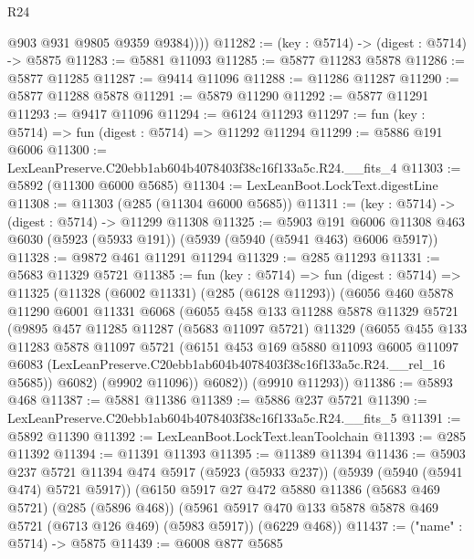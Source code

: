 \begin{lexlean}{R24}
\begin{coremodule}
            @903
            @931
            @9805
            @9359
            @9384))))
@11282 := (key : @5714) -> (digest : @5714) -> @5875
@11283 := @5881 @11093
@11285 := @5877 @11283 @5878
@11286 := @5877 @11285
@11287 := @9414 @11096
@11288 := @11286 @11287
@11290 := @5877 @11288 @5878
@11291 := @5879 @11290
@11292 := @5877 @11291
@11293 := @9417 @11096
@11294 := @6124 @11293
@11297 := fun (key : @5714) => fun (digest : @5714) => @11292 @11294
@11299 := @5886 @191 @6006
@11300 := LexLeanPreserve.C20ebb1ab604b4078403f38c16f133a5c.R24.__fits_4
@11303 := @5892 (@11300 @6000 @5685)
@11304 := LexLeanBoot.LockText.digestLine
@11308 := @11303 (@285 (@11304 @6000 @5685))
@11311 := (key : @5714) -> (digest : @5714) -> @11299 @11308
@11325 := @5903
    @191
    @6006
    @11308
    @463
    @6030
    (@5923 (@5933 @191))
    (@5939 (@5940 (@5941 @463) @6006 @5917))
@11328 := @9872 @461 @11291 @11294
@11329 := @285 @11293
@11331 := @5683 @11329 @5721
@11385 := fun (key : @5714) =>
  fun (digest : @5714) =>
  @11325
    (@11328
      (@6002 @11331)
      (@285 (@6128 @11293))
      (@6056
        @460
        @5878
        @11290
        @6001
        @11331
        @6068
        (@6055
          @458
          @133
          @11288
          @5878
          @11329
          @5721
          (@9895
            @457
            @11285
            @11287
            (@5683 @11097 @5721)
            @11329
            (@6055
              @455
              @133
              @11283
              @5878
              @11097
              @5721
              (@6151
                @453
                @169
                @5880
                @11093
                @6005
                @11097
                @6083
                (LexLeanPreserve.C20ebb1ab604b4078403f38c16f133a5c.R24.__rel_16 @5685))
              @6082)
            (@9902 @11096))
          @6082))
      (@9910 @11293))
@11386 := @5893 @468
@11387 := @5881 @11386
@11389 := @5886 @237 @5721
@11390 := LexLeanPreserve.C20ebb1ab604b4078403f38c16f133a5c.R24.__fits_5
@11391 := @5892 @11390
@11392 := LexLeanBoot.LockText.leanToolchain
@11393 := @285 @11392
@11394 := @11391 @11393
@11395 := @11389 @11394
@11436 := @5903
    @237
    @5721
    @11394
    @474
    @5917
    (@5923 (@5933 @237))
    (@5939 (@5940 (@5941 @474) @5721 @5917))
    (@6150
      @5917
      @27
      @472
      @5880
      @11386
      (@5683 @469 @5721)
      (@285 (@5896 @468))
      (@5961 @5917 @470 @133 @5878 @5878 @469 @5721 (@6713 @126 @469) (@5983 @5917))
      (@6229 @468))
@11437 := ("name" : @5714) -> @5875
@11439 := @6008 @877 @5685

\end{coremodule}
\end{lexlean}
